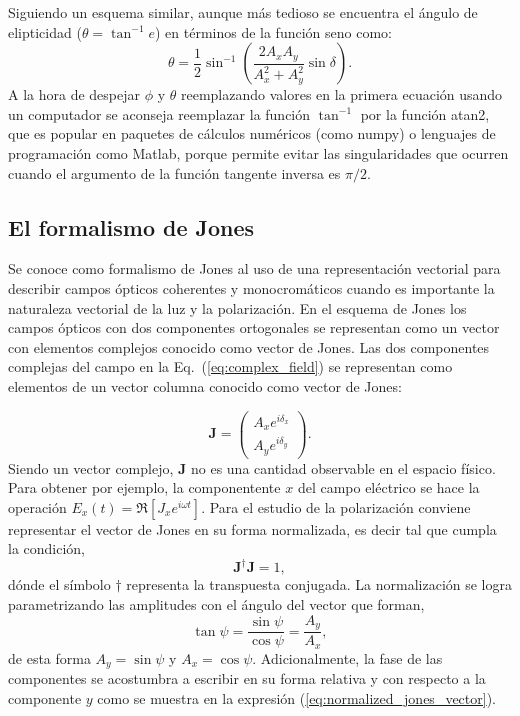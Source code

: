 Siguiendo un esquema similar, aunque más tedioso se encuentra el
ángulo de elipticidad ($\theta = \tan^{-1}{e}$) en términos de la
función seno como:
\begin{equation*}
\theta = \frac{1}{2}\sin^{-1}{\left(\frac{2A_xA_y}{A_x^2+A_y^2}\sin{\delta}\right)}.
\end{equation*}
A la hora de despejar $\phi$ y $\theta$ reemplazando valores en la
primera ecuación usando un computador se aconseja reemplazar la función
$\tan^{-1}$ por la función atan2, que es popular en paquetes de
cálculos numéricos (como numpy) o lenguajes de programación como
Matlab, porque permite evitar las singularidades que ocurren cuando el argumento de la
función tangente inversa es $\pi/2$.

\subsection{El formalismo de Jones}

Se conoce como formalismo de Jones al uso de una representación
vectorial para describir campos ópticos coherentes y monocromáticos cuando es
importante la naturaleza vectorial de la luz y la polarización.  
En el esquema de Jones los campos ópticos con dos componentes ortogonales se
representan como un vector con elementos complejos conocido como
vector de Jones. Las dos componentes complejas del campo en la Eq.~(\ref{eq:complex_field}) se representan como elementos de un vector
columna conocido como vector de Jones:
 
\begin{equation}
\mathbf{J} =\begin{pmatrix} A_xe^{i\delta_x}\\A_ye^{i\delta_y}\end{pmatrix}.
\label{eq:jones_vector}
\end{equation}
Siendo un vector complejo, $\mathbf{J}$ no es una cantidad observable
en el espacio físico. Para obtener por ejemplo, la
componentente  $x$ del campo eléctrico se hace la operación $E_x(t) = \Re
\left[J_xe^{i\omega t}\right]$.
Para el estudio de la polarización conviene representar el vector de
Jones en su forma normalizada, es decir tal que cumpla la
condición, $$\mathbf{J}^{\dagger}\mathbf{J}=1,$$
dónde el símbolo $\dagger$ representa la transpuesta conjugada.
La normalización se logra parametrizando las amplitudes con el ángulo
del vector que forman, $$\tan{\psi}=\frac{\sin{\psi}}{\cos{\psi}}=\frac{A_y}{A_x},$$
de esta forma $A_y=\sin{\psi}$ y $A_x = \cos{\psi}$. Adicionalmente,
la fase de las componentes se acostumbra a escribir en su forma
relativa y con respecto a la componente $y$ como se muestra en la
expresión (\ref{eq:normalized_jones_vector}).

